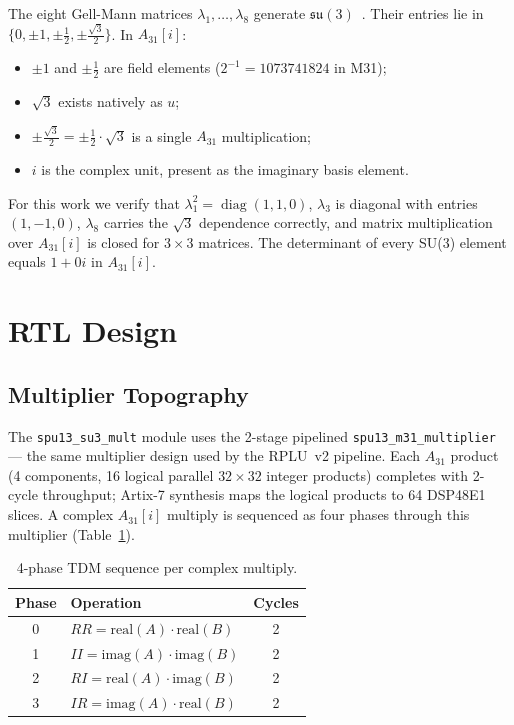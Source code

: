 \documentclass[conference]{IEEEtran}
\begin{document}
The eight Gell-Mann matrices $\lambda_1,\dots,\lambda_8$ generate
$\mathfrak{su}(3)$~\cite{gellmann1962}. Their entries lie in
$\{0, \pm1, \pm\tfrac{1}{2}, \pm\tfrac{\sqrt{3}}{2}\}$. In $A_{31}[i]$:
\begin{itemize}
\item $\pm1$ and $\pm\tfrac{1}{2}$ are field elements
      ($2^{-1} = 1073741824$ in M31);
\item $\sqrt{3}$ exists natively as $u$;
\item $\pm\tfrac{\sqrt{3}}{2} = \pm\tfrac{1}{2}\cdot\sqrt{3}$ is a single
      $A_{31}$ multiplication;
\item $i$ is the complex unit, present as the imaginary basis element.
\end{itemize}
For this work we verify that $\lambda_1^2 = \operatorname{diag}(1,1,0)$,
$\lambda_3$ is diagonal with entries $(1,-1,0)$, $\lambda_8$ carries the
$\sqrt{3}$ dependence correctly, and matrix multiplication over $A_{31}[i]$
is closed for $3\times3$ matrices. The determinant of every SU(3) element
equals $1 + 0i$ in $A_{31}[i]$.

\section{RTL Design}

\subsection{Multiplier Topography}

The \texttt{spu13\_su3\_mult} module uses the 2-stage pipelined
\texttt{spu13\_m31\_multiplier} --- the same multiplier design used by the
RPLU~v2 pipeline. Each $A_{31}$ product (4 components, 16 logical parallel
$32\times32$ integer products) completes with 2-cycle throughput; Artix-7
synthesis maps the logical products to 64 DSP48E1 slices. A complex
$A_{31}[i]$ multiply is sequenced as four phases through this multiplier
(Table~\ref{tab:phases}).

\begin{table}[ht]
\centering
\caption{4-phase TDM sequence per complex multiply.}
\label{tab:phases}
\begin{tabular}{clc}
\toprule
Phase & Operation & Cycles \\
\midrule
0 & $RR = \mathrm{real}(A)\cdot\mathrm{real}(B)$ & 2 \\
1 & $II = \mathrm{imag}(A)\cdot\mathrm{imag}(B)$ & 2 \\
2 & $RI = \mathrm{real}(A)\cdot\mathrm{imag}(B)$ & 2 \\
3 & $IR = \mathrm{imag}(A)\cdot\mathrm{real}(B)$ & 2 \\
\bottomrule
\end{tabular}
\end{table}
\end{document}
